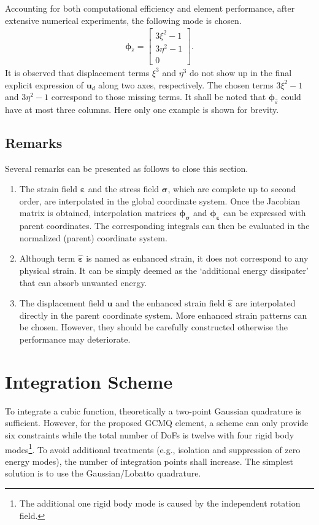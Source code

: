 \documentclass[3p,sort&compress,review,11pt]{elsarticle}
\newcommand*{\mb}{\bm}
\begin{document}
Accounting for both computational efficiency and element performance, after extensive numerical experiments, the following mode is chosen.
\begin{gather}\label{eq:interpolation_enhanced_strain_modified}
\mb{\phi}_{\hat{\varepsilon}}=
\begin{bmatrix}
	3\xi^2-1  \\
	3\eta^2-1 \\
	0
\end{bmatrix}.
\end{gather}
It is observed that displacement terms $\xi^3$ and $\eta^3$ do not show up in the final explicit expression of $\mb{u}_d$ along two axes, respectively. The chosen terms $3\xi^2-1$ and $3\eta^2-1$ correspond to those missing terms. It shall be noted that $\mb{\phi}_{\hat{\varepsilon}}$ could have at most three columns. Here only one example is shown for brevity.
\subsection{Remarks}
Several remarks can be presented as follows to close this section.
\begin{enumerate}
\item The strain field $\mb{\varepsilon}$ and the stress field $\mb{\sigma}$, which are complete up to second order, are interpolated in the global coordinate system. Once the Jacobian matrix is obtained, interpolation matrices $\mb{\phi}_{\mb{\sigma}}$ and $\mb{\phi}_{\mb{\varepsilon}}$ can be expressed with parent coordinates. The corresponding integrals can then be evaluated in the normalized (parent) coordinate system.
\item Although term $\hat{\mb{\varepsilon}}$ is named as enhanced strain, it does not correspond to any physical strain. It can be simply deemed as the `additional energy dissipater' that can absorb unwanted energy.
\item The displacement field $\mb{u}$ and the enhanced strain field $\hat{\mb{\varepsilon}}$ are interpolated directly in the parent coordinate system. More enhanced strain patterns can be chosen. However, they should be carefully constructed otherwise the performance may deteriorate.
\end{enumerate}
\section{Integration Scheme}
To integrate a cubic function, theoretically a two-point Gaussian quadrature is sufficient. However, for the proposed GCMQ element, a  scheme can only provide six constraints while the total number of DoFs is twelve with four rigid body modes\footnote{The additional one rigid body mode is caused by the independent rotation field.}. To avoid additional treatments (e.g., isolation and suppression of zero energy modes), the number of integration points shall increase. The simplest solution is to use the  Gaussian/Lobatto quadrature.
\end{document}
